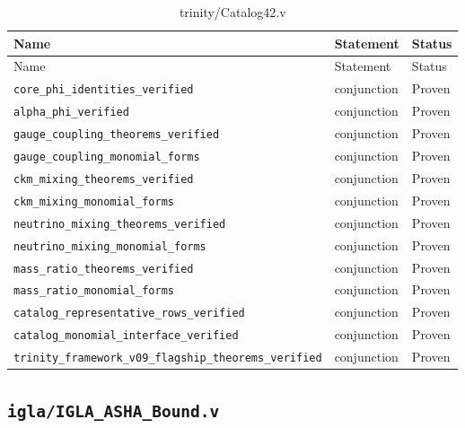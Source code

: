 \begin{longtable}{lll}
\toprule
Name & Statement & Status \\
\midrule
\endfirsthead
\toprule
Name & Statement & Status \\
\midrule
\endhead
\bottomrule
\endfoot
\bottomrule
\caption{trinity/Catalog42.v}
\endlastfoot
\texttt{core\_phi\_identities\_verified} & conjunction & Proven \\
\texttt{alpha\_phi\_verified} & conjunction & Proven \\
\texttt{gauge\_coupling\_theorems\_verified} & conjunction & Proven \\
\texttt{gauge\_coupling\_monomial\_forms} & conjunction & Proven \\
\texttt{ckm\_mixing\_theorems\_verified} & conjunction & Proven \\
\texttt{ckm\_mixing\_monomial\_forms} & conjunction & Proven \\
\texttt{neutrino\_mixing\_theorems\_verified} & conjunction & Proven \\
\texttt{neutrino\_mixing\_monomial\_forms} & conjunction & Proven \\
\texttt{mass\_ratio\_theorems\_verified} & conjunction & Proven \\
\texttt{mass\_ratio\_monomial\_forms} & conjunction & Proven \\
\texttt{catalog\_representative\_rows\_verified} & conjunction & Proven \\
\texttt{catalog\_monomial\_interface\_verified} & conjunction & Proven \\
\texttt{trinity\_framework\_v09\_flagship\_theorems\_verified} &
  conjunction & Proven \\
\end{longtable}

\subsection{\texttt{igla/IGLA\_ASHA\_Bound.v}}
\label{sec:A-coq-asha}

